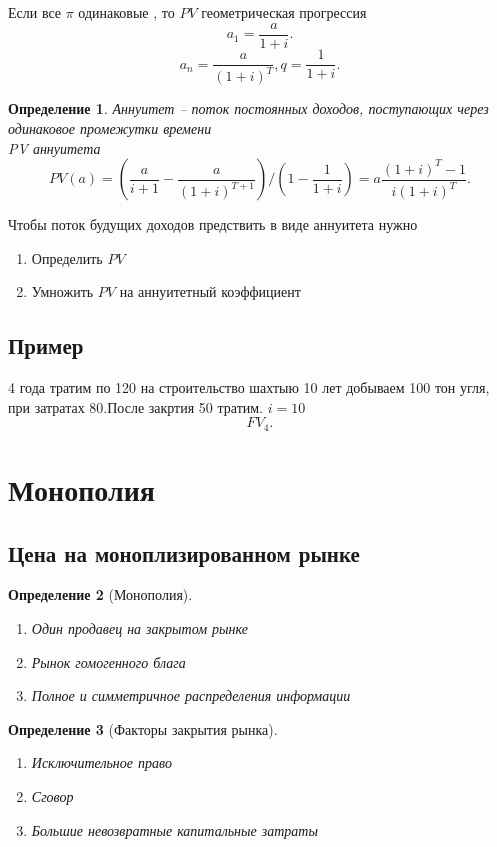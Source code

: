 \documentclass[14pt]{extarticle}
\newtheorem{definition}{Определение}
\begin{document}
\subsection{}
Если все $\pi$ одинаковые , то  $PV$ геометрическая прогрессия
 \[
a_1 = \frac{a}{1 + i}
.\] 
\[
a_{n} = \frac{a}{(1 + i)^{T}}, q = \frac{1}{1 + i}
.\] 
\begin{definition}
    Аннуитет -- поток постоянных доходов, поступающих через одинаковое промежутки времени\\ 
    PV аннуитета
    \[
    PV(a) = (\frac{a}{i + 1} - \frac{a}{(1 + i)^{T + 1}}) / (1 - \frac{1}{1 + i}) =
    a \frac{(1 + i)^{T} - 1}{i(1 + i)^{T}}
    .\] 
\end{definition}
Чтобы поток будущих доходов предствить в виде аннуитета нужно
\begin{enumerate}
    \item Определить $PV$
    \item Умножить  $PV$ на аннуитетный коэффициент
\end{enumerate}
\subsection{Пример}
4 года тратим по 120 на строительство шахтыю 10 лет добываем 100 тон угля, при затратах 80.После закртия 50 тратим. $i = 10$
\[
FV_{4}
.\] 
\section{Монополия}
\subsection{Цена на моноплизированном рынке}
\begin{definition}[Монополия]
    \begin{enumerate}
        \item Один продавец на закрытом рынке
        \item Рынок гомогенного блага
        \item Полное и симметричное распределения информации
    \end{enumerate}
\end{definition}
\begin{definition}[Факторы закрытия рынка]
    \begin{enumerate}
        \item Исключительное право
        \item Сговор
        \item Большие невозвратные капитальные затраты
    \end{enumerate}
\end{definition}
\end{document}
